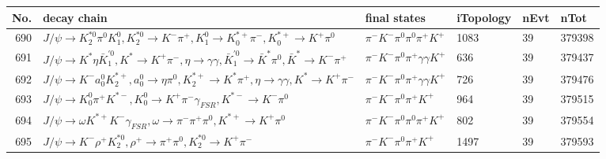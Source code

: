 \begin{table}[htbp] 
\begin{center}
\begin{small}
\begin{tabular}{rlllll}\hline\hline
 No. & decay chain & final states &  iTopology & nEvt & nTot \\\hline
690&$J/\psi       \rightarrow K_2^{*0}       \pi^{0}        K_1^{0}        , K_2^{*0}        \rightarrow K^{-}          \pi^{+}        , K_1^{0}         \rightarrow K_{0}^{*+}     \pi^{-}        , K_{0}^{*+}      \rightarrow K^{+}          \pi^{0}        $&$\pi^{-}        K^{-}          \pi^{0}        \pi^{0}        \pi^{+}        K^{+}          $& 1083&   39&379398\\
691&$J/\psi       \rightarrow K^{*}          \eta          \bar{K}_1^{'0}, K^{*}           \rightarrow K^{+}          \pi^{-}        , \eta           \rightarrow \gamma       \gamma       , \bar{K}_1^{'0} \rightarrow \bar{K}^{*}   \pi^{0}        , \bar{K}^{*}    \rightarrow K^{-}          \pi^{+}        $&$\pi^{-}        K^{-}          \pi^{0}        \pi^{+}        \gamma       \gamma       K^{+}          $&  636&   39&379437\\
692&$J/\psi       \rightarrow K^{-}          a_{0}^{0}      K_2^{*+}       , a_{0}^{0}       \rightarrow \eta          \pi^{0}        , K_2^{*+}        \rightarrow K^{*}          \pi^{+}        , \eta           \rightarrow \gamma       \gamma       , K^{*}           \rightarrow K^{+}          \pi^{-}        $&$\pi^{-}        K^{-}          \pi^{0}        \pi^{+}        \gamma       \gamma       K^{+}          $&  726&   39&379476\\
693&$J/\psi       \rightarrow K_0^{0}        \pi^{+}        K^{*-}         , K_0^{0}         \rightarrow K^{+}          \pi^{-}        \gamma_{FSR} , K^{*-}          \rightarrow K^{-}          \pi^{0}        $&$\pi^{-}        K^{-}          \pi^{0}        \pi^{+}        K^{+}          $&  964&   39&379515\\
694&$J/\psi       \rightarrow \omega         K^{*+}         K^{-}          \gamma_{FSR} , \omega          \rightarrow \pi^{-}        \pi^{+}        \pi^{0}        , K^{*+}          \rightarrow K^{+}          \pi^{0}        $&$\pi^{-}        K^{-}          \pi^{0}        \pi^{0}        \pi^{+}        K^{+}          $&  802&   39&379554\\
695&$J/\psi       \rightarrow K^{-}          \rho^{+}      K_2^{*0}       , \rho^{+}       \rightarrow \pi^{+}        \pi^{0}        , K_2^{*0}        \rightarrow K^{+}          \pi^{-}        $&$\pi^{-}        K^{-}          \pi^{0}        \pi^{+}        K^{+}          $& 1497&   39&379593\\

\end{tabular}
\end{small}
\end{center}
\end{table}
